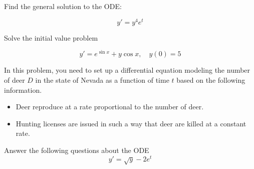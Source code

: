 \documentclass[addpoints,12pt]{exam}
\begin{document}
\newpage
\begin{questions}

\question[10] Find the general solution to the ODE:

$$y'=y^4e^t$$
\newpage

\question[10] Solve the initial value problem

$$y'=e^{\sin x}+y\cos x,\quad y(0)=5$$

\newpage

\question[6] In this problem, you need to set up a differential equation modeling the number of deer $D$ in the state of Nevada as a function of time $t$ based on the following information.
 \begin{itemize}
  \item Deer reproduce at a rate proportional to the number of deer.
  \item Hunting licenses are issued in such a way that deer are killed at a constant rate.
 \end{itemize}
 
 
 \newpage

\question[8] Answer the following questions about the ODE
$$y'=\sqrt y - 2e^{t}$$

\end{questions}
\end{document}
